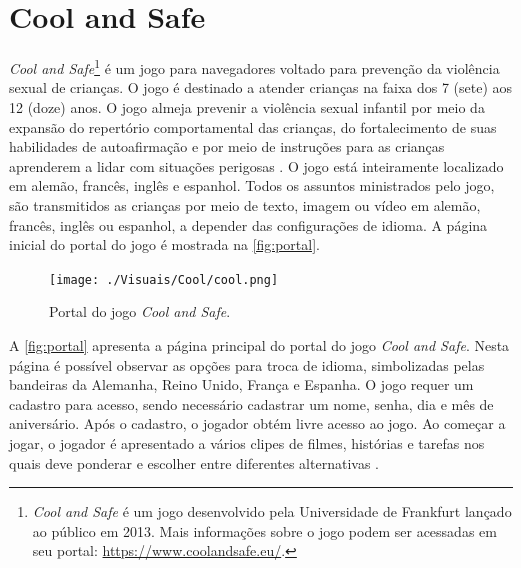 

\section{Cool and Safe}\label{sssec:CeS}

\textit{Cool and Safe}\footnote{\textit{Cool and Safe} é um jogo desenvolvido pela Universidade de Frankfurt lançado ao público em 2013. Mais informações sobre o jogo podem ser acessadas em seu portal: \url{https://www.coolandsafe.eu/}.} é um jogo para navegadores voltado para prevenção da violência sexual de crianças. O jogo é destinado a atender crianças na faixa dos 7 (sete) aos 12 (doze) anos. O jogo almeja prevenir a violência sexual infantil por meio da expansão do repertório comportamental das crianças, do fortalecimento de suas habilidades de autoafirmação e por meio de instruções para as crianças aprenderem a lidar com situações perigosas \cite{pajala2018compiled}. O jogo está inteiramente localizado em alemão, francês, inglês e espanhol. Todos os assuntos ministrados pelo jogo, são transmitidos as crianças por meio de texto, imagem ou vídeo em alemão, francês, inglês ou espanhol, a depender das configurações de idioma. A página inicial do portal do jogo é mostrada na \autoref{fig:portal}.

\begin{figure}[htb]

	\caption{\label{fig:portal}Portal do jogo \textit{Cool and Safe}.}
  \begin{center}%
    \texttt{[image: ./Visuais/Cool/cool.png]}
	\end{center}%

\end{figure}

A \autoref{fig:portal} apresenta a página principal do portal do jogo \textit{Cool and Safe}. Nesta página é possível observar as opções para troca de idioma, simbolizadas pelas bandeiras da Alemanha, Reino Unido, França e Espanha. O jogo requer um cadastro para acesso, sendo necessário cadastrar um nome, senha, dia e mês de aniversário. Após o cadastro, o jogador obtém livre acesso ao jogo. Ao começar a jogar, o jogador é apresentado a vários clipes de filmes, histórias e tarefas nos quais deve ponderar e escolher entre diferentes alternativas \cite{mueller2012web}. 

